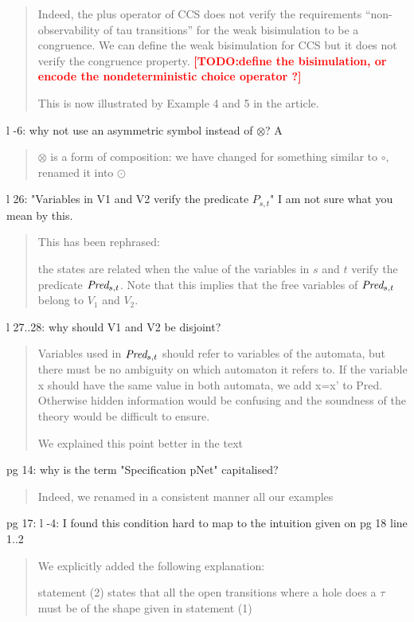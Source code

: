\documentclass{article}
\newcommand{\TODO}[1]{\textcolor{red}{\textbf{[TODO:#1]}}}
\begin{document}
\begin{quote}
Indeed, the plus operator of CCS does not verify the requirements ``non-observability of tau transitions'' for the weak bisimulation to be a congruence. We can define the weak bisimulation for CCS but it does not verify the congruence property. \TODO{define the bisimulation, or encode the nondeterministic choice operator ?}

This is now illustrated by Example 4 and 5 in the article.
\end{quote}

l -6: why not use an asymmetric symbol instead of $\otimes$? 
A%
\begin{quote}
$\otimes$ is a form of composition: we have changed for something similar to $\circ$, renamed it into $\odot$
\end{quote}

l 26: "Variables in V1 and V2 verify the predicate $P_{s,t}$" I am not sure what you mean by this.
\begin{quote}
This has been rephrased:

the states are related when the value of the variables in $s$ and $t$  verify the predicate $\Pred_{s,t}$. Note that this implies that the free variables of  $\Pred_{s,t}$ belong to $V_1$ and $V_2$.

\end{quote}

l 27..28: why should V1 and V2 be disjoint?
\begin{quote}
Variables used in $\Pred_{s,t}$ should refer to variables of the automata, but there must be no ambiguity on which automaton it refers to. If the variable x should have the same value in both automata, we add x=x' to Pred. Otherwise hidden information would be confusing and the soundness of the theory would be difficult to ensure.

We explained this point better in the text
\end{quote}

pg 14:  why is the term "Specification pNet" capitalised?
\begin{quote}
Indeed, we renamed in a consistent manner all our examples
\end{quote}

pg 17: l -4: I found this condition hard to map to the intuition given on pg 18 line 1..2 
\begin{quote}
We explicitly added the following explanation:

statement (2) states that all the open transitions where a hole does  a $\tau$ must be of the shape given in statement (1)
\end{quote}
\end{document}
